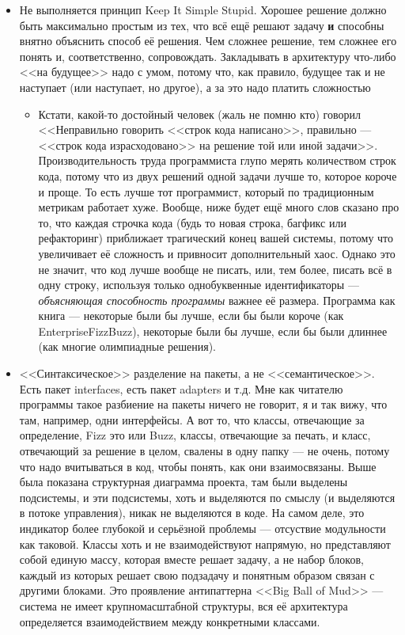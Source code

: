 \documentclass[a5paper]{article}
\begin{document}
\begin{itemize}
    \item Не выполняется принцип Keep It Simple Stupid. Хорошее решение должно быть максимально простым из тех, что всё ещё решают задачу \textbf{и} способны внятно объяснить способ её решения. Чем сложнее решение, тем сложнее его понять и, соответственно, сопровождать. Закладывать в архитектуру что-либо <<на будущее>> надо с умом, потому что, как правило, будущее так и не наступает (или наступает, но другое), а за это надо платить сложностью
    \begin{itemize}
        \item Кстати, какой-то достойный человек (жаль не помню кто) говорил <<Неправильно говорить <<строк кода написано>>, правильно --- <<строк кода израсходовано>> на решение той или иной задачи>>. Производительность труда программиста глупо мерять количеством строк кода, потому что из двух решений одной задачи лучше то, которое короче и проще. То есть лучше тот программист, который по традиционным метрикам работает хуже. Вообще, ниже будет ещё много слов сказано про то, что каждая строчка кода (будь то новая строка, багфикс или рефакторинг) приближает трагический конец вашей системы, потому что увеличивает её сложность и привносит дополнительный хаос. Однако это не значит, что код лучше вообще не писать, или, тем более, писать всё в одну строку, используя только однобуквенные идентификаторы --- \textit{объясняющая способность программы} важнее её размера. Программа как книга --- некоторые были бы лучше, если бы были короче (как EnterpriseFizzBuzz), некоторые были бы лучше, если бы были длиннее (как многие олимпиадные решения).
    \end{itemize}
    \item <<Синтаксическое>> разделение на пакеты, а не <<семантическое>>. Есть пакет interfaces, есть пакет adapters и т.д. Мне как читателю программы такое разбиение на пакеты ничего не говорит, я и так вижу, что там, например, одни интерфейсы. А вот то, что классы, отвечающие за определение, Fizz это или Buzz, классы, отвечающие за печать, и класс, отвечающий за решение в целом, свалены в одну папку --- не очень, потому что надо вчитываться в код, чтобы понять, как они взаимосвязаны. Выше была показана структурная диаграмма проекта, там были выделены подсистемы, и эти подсистемы, хоть и выделяются по смыслу (и выделяются в потоке управления), никак не выделяются в коде. На самом деле, это индикатор более глубокой и серьёзной проблемы --- отсуствие модульности как таковой. Классы хоть и не взаимодействуют напрямую, но представляют собой единую массу, которая вместе решает задачу, а не набор блоков, каждый из которых решает свою подзадачу и понятным образом связан с другими блоками. Это проявление антипаттерна <<Big Ball of Mud>> --- система не имеет крупномасштабной структуры, вся её архитектура определяется взаимодействием между конкретными классами.

\end{itemize}
\end{document}

